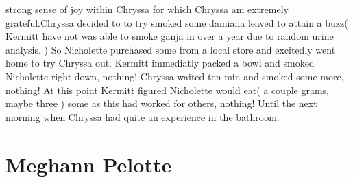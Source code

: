 \documentclass[12pt]{book}
\begin{document}
strong sense of joy within Chryssa for which Chryssa am extremely grateful.Chryssa decided to to try smoked some damiana leaved to attain a buzz( Kermitt have not was able to smoke ganja in over a year due to random urine analysis. ) So Nicholette purchased some from a local store and excitedly went home to try Chryssa out. Kermitt immediatly packed a bowl and smoked Nicholette right down, nothing! Chryssa waited ten min and smoked some more, nothing! At this point Kermitt figured Nicholette would eat( a couple grams, maybe three ) some as this had worked for others, nothing! Until the next morning when Chryssa had quite an experience in the bathroom.



\chapter{Meghann Pelotte}
\end{document}
